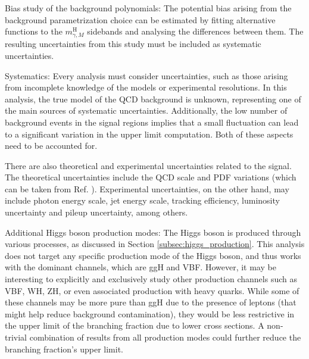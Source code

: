 \begin{myitemlist}
    \item[Bias study of the background polynomials:] The potential bias arising from the background parametrization choice can be estimated by fitting alternative functions to the $m^{\text{H}}_{\gamma, M}$ sidebands and analysing the differences between them. The resulting uncertainties from this study must be included as systematic uncertainties.

    \item[Systematics:] Every analysis must consider uncertainties, such as those arising from incomplete knowledge of the models or experimental resolutions. In this analysis, the true model of the QCD background is unknown, representing one of the main sources of systematic uncertainties. Additionally, the low number of background events in the signal regions implies that a small fluctuation can lead to a significant variation in the upper limit computation. Both of these aspects need to be accounted for.
    
    There are also theoretical and experimental uncertainties related to the signal. The theoretical uncertainties include the QCD scale and PDF variations (which can be taken from Ref. \cite{LHCHiggsCrossSectionWorkingGroup:2016ypw}). Experimental uncertainties, on the other hand, may include photon energy scale, jet energy scale, tracking efficiency, luminosity uncertainty and pileup uncertainty, among others.
    
    \item[Additional Higgs boson production modes:] The Higgs boson is produced through various processes, as discussed in Section \ref{subsec:higgs_production}. This analysis does not target any specific production mode of the Higgs boson, and thus works with the dominant channels, which are ggH and VBF. However, it may be interesting to explicitly and exclusively study other production channels such as VBF, WH, ZH, or even associated production with heavy quarks. While some of these channels may be more pure than ggH due to the presence of leptons (that might help reduce background contamination), they would be less restrictive in the upper limit of the branching fraction due to lower cross sections. A non-trivial combination of results from all production modes could further reduce the branching fraction's upper limit.
\end{myitemlist}
